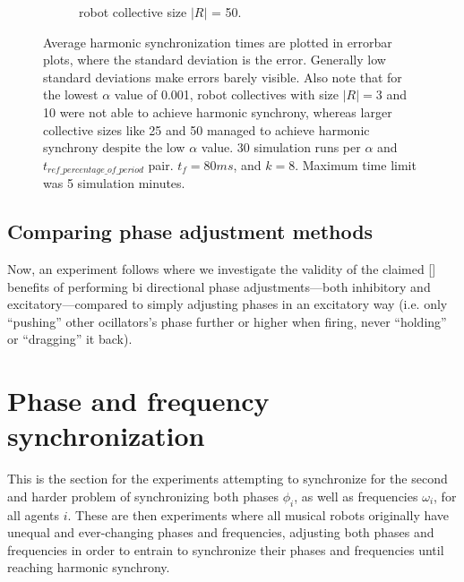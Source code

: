 \begin{figure}[ht!]
\begin{subfigure}[b]{0.5\textwidth}
		\caption{robot collective size $|R|$ = 50.}
		\label{fig:sub:t_ref_dyn_x_alpha_collsize50}
	  \end{subfigure}
	  \caption{Average harmonic synchronization times are plotted in errorbar plots, where the standard deviation is the error. Generally low standard deviations make errors barely visible. Also note that for the lowest $\alpha$ value of 0.001, robot collectives with size $|R|=3$ and 10 were not able to achieve harmonic synchrony, whereas larger collective sizes like 25 and 50 managed to achieve harmonic synchrony despite the low $\alpha$ value. 30 simulation runs per $\alpha$ and $t_{ref\_percentage\_of\_period}$ pair. $t_f=80ms$, and $k=8$. Maximum time limit was 5 simulation minutes.}
	  \label{fig:phase_sync_hyperparam_tuning_experiment}
	\end{figure}
	
	
	\subsection{Comparing phase adjustment methods}
	Now, an experiment follows where we investigate the validity of the claimed [] benefits of performing bi directional phase adjustments—both inhibitory and excitatory—compared to simply adjusting phases in an excitatory way (i.e. only ``pushing'' other ocillators's phase further or higher when firing, never ``holding'' or ``dragging'' it back).
	
	



\section{Phase and frequency synchronization}
This is the section for the experiments attempting to synchronize for the second and harder problem of synchronizing both phases $\phi_i$, as well as frequencies $\omega_i$, for all agents $i$. These are then experiments where all musical robots originally have unequal and ever-changing phases  and frequencies, adjusting both phases and frequencies in order to entrain to synchronize their phases and frequencies until reaching harmonic synchrony.

